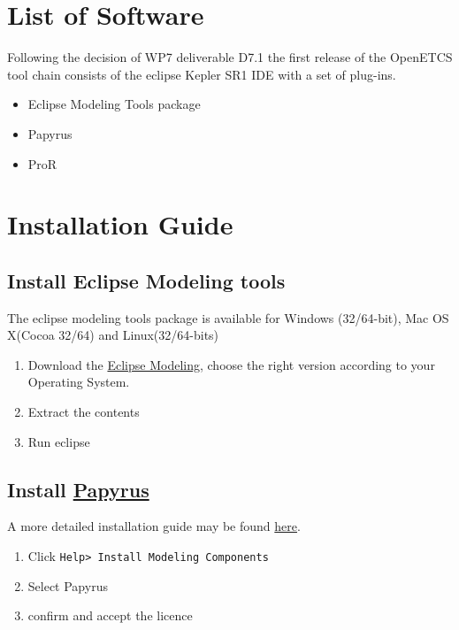 \documentclass{openetcs_report}
\begin{document}
\begingroup
\renewcommand{\chapter}[2]{}%
  
  
\endgroup
\section{List of Software}
Following the decision of WP7 deliverable D7.1 the first release of
the OpenETCS tool chain consists of the eclipse Kepler SR1  IDE with a set of plug-ins.

\begin{itemize}
\item Eclipse Modeling Tools package 
\item Papyrus
\item ProR
\end{itemize}


\section{Installation Guide}
\subsection{Install Eclipse Modeling tools}
The eclipse modeling tools package is available for Windows
(32/64-bit), Mac OS X(Cocoa 32/64) and Linux(32/64-bits)

\begin{enumerate}
\item Download the
  \href{http://www.eclipse.org/downloads/packages/eclipse-modeling-tools/keplerr}{Eclipse
    Modeling}, choose the right version according to your Operating System.
\item Extract the contents 
\item Run eclipse
\end{enumerate}


 \subsection{Install \href{http://www.eclipse.org/papyrus/}{Papyrus}}
A more detailed installation guide may be found
\href{https://github.com/openETCS/toolchain/blob/master/ToolDescription/Papyrus/HowTo_install_papyrus_V1.2.0.pdf}{here}.
\begin{enumerate}
\item Click \verb+Help> Install Modeling Components+
\item Select Papyrus
\item confirm and accept the licence
\end{enumerate}
\end{document}
